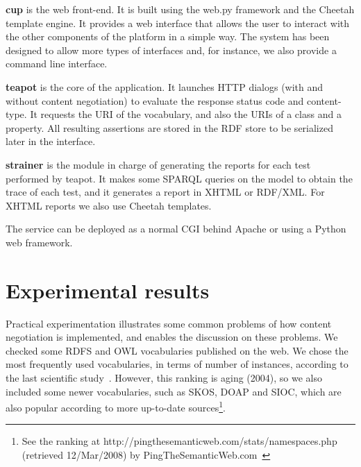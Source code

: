 \documentclass{../templates/llncs}
\begin{document}
\begin{description}

  \item \textbf{cup} is the web front-end. It is built using the web.py framework
        and the Cheetah template engine. It provides a web interface that allows 
        the user to interact with the other components of the platform in a 
        simple way. The system has been designed to allow more types 
        of interfaces and, for instance, we also provide a command line interface.

  \item \textbf{teapot} is the core of the application. It launches
        HTTP dialogs 
        (with and without content negotiation) to evaluate the response
        status code and content-type. It requests the URI of the vocabulary, and 
        also the URIs of a class and a property. All resulting assertions are 
        stored in the RDF store to be serialized later in the interface.

  \item \textbf{strainer} is the module in charge of generating the reports for
        each test performed by teapot. It makes some SPARQL %
        queries on the model to obtain the trace of each test, and it generates 
        a report in XHTML or RDF/XML. For XHTML reports we also use Cheetah 
        templates.

\end{description}

The service can be deployed as a normal CGI behind Apache or using a Python web 
framework. %

\section{\label{sec:experimental}Experimental results}

Practical experimentation illustrates some common problems of how
content negotiation is implemented, and enables the discussion on 
these problems. We checked some RDFS and OWL vocabularies published on the web.
We chose the most frequently used vocabularies, in terms of number of
instances, according to the last scientific study~\cite{Li2005}. However,
this ranking is aging (2004), so we also included some newer
vocabularies, such as SKOS, DOAP and SIOC, which are also popular
according to more up-to-date sources\footnote{See the ranking at http://pingthesemanticweb.com/stats/namespaces.php (retrieved 12/Mar/2008) by PingTheSemanticWeb.com~\cite{Bojars2007}}.
\end{document}
